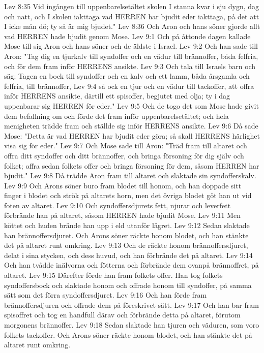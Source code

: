 Lev 8:35  Vid ingången till uppenbarelsetältet skolen I stanna kvar i sju dygn, dag och natt, och I skolen iakttaga vad HERREN har bjudit eder iakttaga, på det att I icke mån dö; ty så är mig bjudet."
Lev 8:36  Och Aron och hans söner gjorde allt vad HERREN hade bjudit genom Mose.
Lev 9:1  Och på åttonde dagen kallade Mose till sig Aron och hans söner och de äldste i Israel.
Lev 9:2  Och han sade till Aron: "Tag dig en tjurkalv till syndoffer och en vädur till brännoffer, båda felfria, och för dem fram inför HERRENS ansikte.
Lev 9:3  Och tala till Israels barn och säg: Tagen en bock till syndoffer och en kalv och ett lamm, båda årsgamla och felfria, till brännoffer,
Lev 9:4  så ock en tjur och en vädur till tackoffer, att offra inför HERRENS ansikte, därtill ett spisoffer, begjutet med olja; ty i dag uppenbarar sig HERREN för eder."
Lev 9:5  Och de togo det som Mose hade givit dem befallning om och förde det fram inför uppenbarelsetältet; och hela menigheten trädde fram och ställde sig inför HERRENS ansikte.
Lev 9:6  Då sade Mose: "Detta är vad HERREN har bjudit eder göra; så skall HERRENS härlighet visa sig för eder."
Lev 9:7  Och Mose sade till Aron: "Träd fram till altaret och offra ditt syndoffer och ditt brännoffer, och bringa försoning för dig själv och folket; offra sedan folkets offer och bringa försoning för dem, såsom HERREN har bjudit."
Lev 9:8  Då trädde Aron fram till altaret och slaktade sin syndofferskalv.
Lev 9:9  Och Arons söner buro fram blodet till honom, och han doppade sitt finger i blodet och strök på altarets horn, men det övriga blodet göt han ut vid foten av altaret.
Lev 9:10  Och syndoffersdjurets fett, njurar och leverfett förbrände han på altaret, såsom HERREN hade bjudit Mose.
Lev 9:11  Men köttet och huden brände han upp i eld utanför lägret.
Lev 9:12  Sedan slaktade han brännoffersdjuret. Och Arons söner räckte honom blodet, och han stänkte det på altaret runt omkring.
Lev 9:13  Och de räckte honom brännoffersdjuret, delat i sina stycken, och dess huvud, och han förbrände det på altaret.
Lev 9:14  Och han tvådde inälvorna och fötterna och förbrände dem ovanpå brännoffret, på altaret.
Lev 9:15  Därefter förde han fram folkets offer. Han tog folkets syndoffersbock och slaktade honom och offrade honom till syndoffer, på samma sätt som det förra syndoffersdjuret.
Lev 9:16  Och han förde fram brännoffersdjuren och offrade dem på föreskrivet sätt.
Lev 9:17  Och han bar fram spisoffret och tog en handfull därav och förbrände detta på altaret, förutom morgonens brännoffer.
Lev 9:18  Sedan slaktade han tjuren och väduren, som voro folkets tackoffer. Och Arons söner räckte honom blodet, och han stänkte det på altaret runt omkring.
